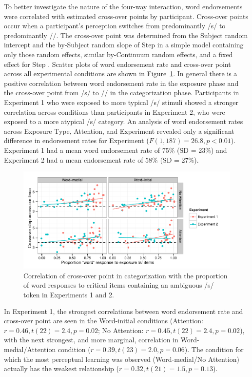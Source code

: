 To better investigate the nature of the four-way interaction, word endorsements were correlated with estimated cross-over points by participant.  
Cross-over points occur when a participant's perception switches from predominantly /s/ to predominantly /\textesh/.
The cross-over point was determined from the Subject random intercept and the by-Subject random slope of Step in a simple model containing only those random effects, similar by-Continuum random effects, and a fixed effect for Step \citep{Kleber2012}. 
Scatter plots of word endorsement rate and cross-over point across all experimental conditions are shown in Figure~\ref{fig:exp12xover}.
In general there is a positive correlation between word endorsement rate in the exposure phase and the cross-over point from /s/ to /\textesh/ in the categorization phase.
Participants in Experiment 1 who were exposed to more typical /s/ stimuli showed a stronger correlation across conditions than participants in Experiment 2, who were exposed to a more atypical /s/ category.
An analysis of word endorsement rates across Exposure Type, Attention, and Experiment revealed only a significant difference in endorsement rates for Experiment ($F(1, 187) = 26.8, p < 0.01$).  
Experiment 1 had a mean word endorsement rate of 75\% (SD = 23\%) and Experiment 2 had a mean endorsement rate of 58\% (SD = 27\%).

\begin{figure}[!ht]
\caption{Correlation of cross-over point in categorization with the proportion of word responses to critical items containing an ambiguous /s/ token in Experiments 1 and 2.}\label{fig:exp12xover}
\begin{center}
\includegraphics[width=\textwidth]{graphs/exp12_xoverwordresp}
\end{center}
\end{figure} 

In Experiment 1, the strongest correlations between word endorsement rate and cross-over point are seen in the Word-initial conditions (Attention: $r = 0.46, t(22) = 2.4, p = 0.02$; No Attention: $r = 0.45, t(22) = 2.4, p = 0.02$), with the next strongest, and more marginal, correlation in Word-medial/Attention condition ($r = 0.39, t(23) = 2.0, p = 0.06$).  The condition for which the most perceptual learning was observed (Word-medial/No Attention) actually has the weakest relationship ($r = 0.32, t(21) = 1.5, p = 0.13$).

